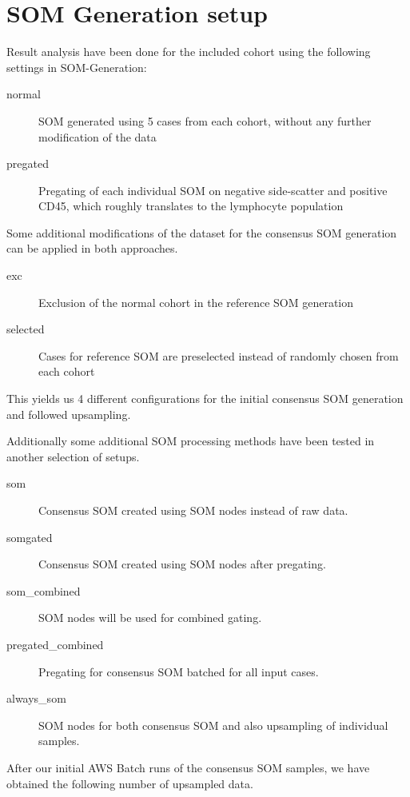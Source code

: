 \documentclass[11pt,a4paper]{article}
\begin{document}
\section{SOM Generation setup}

Result analysis have been done for the included cohort using the following settings in SOM-Generation:

\begin{description}
   \item[normal] SOM generated using 5 cases from each cohort, without any further modification of the data
   \item[pregated] Pregating of each individual SOM on negative side-scatter and positive CD45, which roughly translates to the lymphocyte population
\end{description}

Some additional modifications of the dataset for the consensus SOM generation can be applied in both approaches.

\begin{description}
   \item[exc] Exclusion of the normal cohort in the reference SOM generation
   \item[selected] Cases for reference SOM are preselected instead of randomly chosen from each cohort
\end{description}

This yields us 4 different configurations for the initial consensus SOM generation and followed upsampling.

Additionally some additional SOM processing methods have been tested in another selection of setups.

\begin{description}
   \item[som] Consensus SOM created using SOM nodes instead of raw data.
   \item[somgated] Consensus SOM created using SOM nodes after pregating.
   \item[som\_combined] SOM nodes will be used for combined gating.
   \item[pregated\_combined] Pregating for consensus SOM batched for all input cases.
   \item[always\_som] SOM nodes for both consensus SOM and also upsampling of individual samples.
\end{description}

After our initial AWS Batch runs of the consensus SOM samples, we have obtained the following number of upsampled data.
\end{document}
